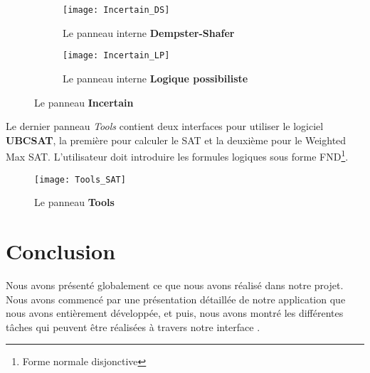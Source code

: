 \begin{figure}[H]
\begin{subfigure}{0.49\textwidth}
\texttt{[image: Incertain\_DS]}
\caption{Le panneau interne \textbf{Dempster-Shafer}}
\end{subfigure}
\begin{subfigure}{0.49\textwidth}
\hfill
\texttt{[image: Incertain\_LP]}
\caption{Le panneau interne \textbf{Logique possibiliste}}
\end{subfigure}
\caption{Le panneau \textbf{Incertain}}
\end{figure}

Le dernier panneau \textit{Tools} contient deux interfaces pour utiliser le logiciel \textbf{UBCSAT}, la
première pour calculer le SAT et la deuxième pour le Weighted Max SAT. L'utilisateur doit introduire les formules
logiques sous forme FND\footnote{Forme normale disjonctive}.

\begin{figure}[H]
\centering
\texttt{[image: Tools\_SAT]}
\caption{Le panneau \textbf{Tools}}

\end{figure}
\vspace*{-2em}
{}
\section*{Conclusion}

Nous avons présenté globalement ce que nous avons réalisé dans notre projet. Nous avons commencé par une
présentation détaillée de notre application \appname que nous avons entièrement développée, et puis, nous
avons montré les différentes tâches qui peuvent être réalisées à travers notre interface \platformename.
